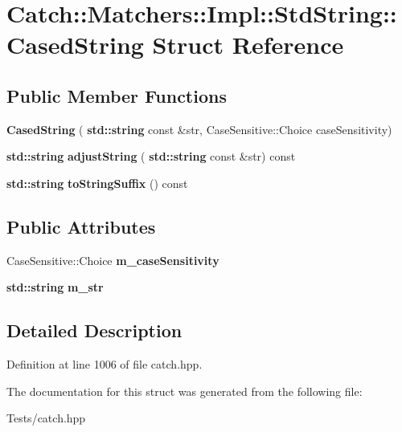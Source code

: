 \hypertarget{struct_catch_1_1_matchers_1_1_impl_1_1_std_string_1_1_cased_string}{}\section{Catch\+:\+:Matchers\+:\+:Impl\+:\+:Std\+String\+:\+:Cased\+String Struct Reference}
\label{struct_catch_1_1_matchers_1_1_impl_1_1_std_string_1_1_cased_string}
\subsection*{Public Member Functions}
\begin{DoxyCompactItemize}
\item 
\mbox{\label{struct_catch_1_1_matchers_1_1_impl_1_1_std_string_1_1_cased_string_aebd017c88423d8a11c62cff85754a22d}} 
{\bfseries Cased\+String} (\textbf{ std\+::string} const \&str, Case\+Sensitive\+::\+Choice case\+Sensitivity)
\item 
\mbox{\label{struct_catch_1_1_matchers_1_1_impl_1_1_std_string_1_1_cased_string_a8117fdcee8fd8a8e5001b38e0bd19848}} 
\textbf{ std\+::string} {\bfseries adjust\+String} (\textbf{ std\+::string} const \&str) const
\item 
\mbox{\label{struct_catch_1_1_matchers_1_1_impl_1_1_std_string_1_1_cased_string_ac12f719f5d1aeb28a2bc2f6cc8b95b37}} 
\textbf{ std\+::string} {\bfseries to\+String\+Suffix} () const
\end{DoxyCompactItemize}
\subsection*{Public Attributes}
\begin{DoxyCompactItemize}
\item 
\mbox{\label{struct_catch_1_1_matchers_1_1_impl_1_1_std_string_1_1_cased_string_af399ed93051d8981e298206dee6898b3}} 
Case\+Sensitive\+::\+Choice {\bfseries m\+\_\+case\+Sensitivity}
\item 
\mbox{\label{struct_catch_1_1_matchers_1_1_impl_1_1_std_string_1_1_cased_string_a9f8ce063a934330ac59bf8638f047e99}} 
\textbf{ std\+::string} {\bfseries m\+\_\+str}
\end{DoxyCompactItemize}


\subsection{Detailed Description}


Definition at line 1006 of file catch.\+hpp.



The documentation for this struct was generated from the following file\+:\begin{DoxyCompactItemize}
\item 
Tests/catch.\+hpp\end{DoxyCompactItemize}
